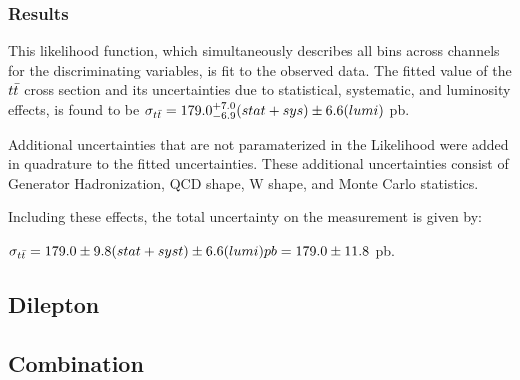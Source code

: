 \subsubsection{Results}

This likelihood function, which simultaneously describes all bins across channels for the discriminating variables, is fit to the observed data.
The fitted value of the $t\bar{t}$ cross section and its uncertainties due to statistical, systematic, and luminosity effects, is found to be $\sigma_{t\bar{t}} = 179.0 ^{+7.0}_{-6.9}(stat+sys) \pm 6.6 (lumi)$ pb.

Additional uncertainties that are not paramaterized in the Likelihood were added in quadrature to the fitted uncertainties.
These additional uncertainties consist of Generator Hadronization, QCD shape, W shape, and Monte Carlo statistics.

Including these effects, the total uncertainty on the measurement is given by:

$\sigma_{t\bar{t}} = 179.0 \pm 9.8 (stat + syst) \pm 6.6 (lumi) pb = 179.0 \pm 11.8$ pb.




\subsection{Dilepton}


\subsection{Combination}



